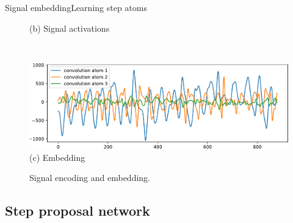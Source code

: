 \documentclass[8pt,t,aspectratio=1610]{beamer}
\newcommand{\ratio}{0.5}
\begin{document}
\begin{frame}{Signal embedding}{Learning step atoms}
\begin{minipage}[t]{0.54\linewidth}
\begin{figure}
\begin{minipage}{\linewidth}
            {\small (b)\; Signal activations}
        \end{minipage}\\
        \begin{minipage}{\linewidth}
            \centering
            \includegraphics[trim= 0 0 0 0, width=\ratio\linewidth, clip]{signal_walk_young_female_csc_3.pdf}\\
            {\small (c)\; Embedding}
        \end{minipage}
        \caption{Signal encoding and embedding.}
    \end{figure}
\end{minipage}

\end{frame}



\subsection{Step proposal network}

\end{document}
